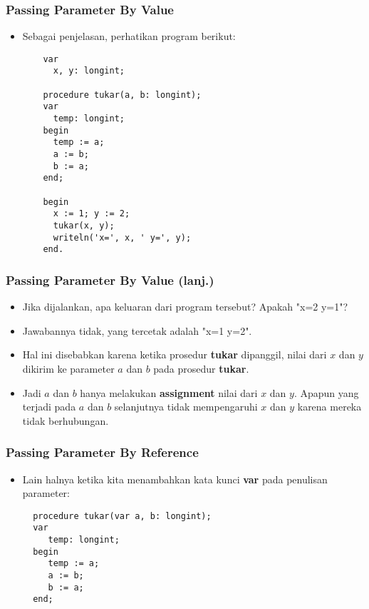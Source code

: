 \documentclass{beamer}
\begin{document}
\begin{frame}[fragile]
\frametitle{Passing Parameter By Value}
\begin{itemize}
  \item Sebagai penjelasan, perhatikan program berikut:
  \begin{lstlisting}
    var
      x, y: longint;

    procedure tukar(a, b: longint);
    var
      temp: longint;
    begin
      temp := a;
      a := b;
      b := a;
    end;

    begin
      x := 1; y := 2;
      tukar(x, y);
      writeln('x=', x, ' y=', y);
    end.
  \end{lstlisting}
\end{itemize}
\end{frame}

\begin{frame}[fragile]
\frametitle{Passing Parameter By Value (lanj.)}
\begin{itemize}
  \item Jika dijalankan, apa keluaran dari program tersebut? Apakah "x=2 y=1"?
  \item Jawabannya \alert{tidak}, yang tercetak adalah "x=1 y=2".
  \item Hal ini disebabkan karena ketika prosedur \textbf{tukar} dipanggil, \alert{nilai} dari $x$ dan $y$ dikirim ke parameter $a$ dan $b$ pada prosedur \textbf{tukar}.
  \item Jadi $a$ dan $b$ hanya melakukan \textbf{assignment} nilai dari $x$ dan $y$. Apapun yang terjadi pada $a$ dan $b$ selanjutnya tidak mempengaruhi $x$ dan $y$ karena mereka \alert{tidak berhubungan}.
\end{itemize}
\end{frame}

\begin{frame}[fragile]
\frametitle{Passing Parameter By Reference}
\begin{itemize}
  \item Lain halnya ketika kita menambahkan kata kunci \textbf{var} pada penulisan parameter:
  \begin{lstlisting}
  procedure tukar(var a, b: longint);
  var
     temp: longint;
  begin
     temp := a;
     a := b;
     b := a;
  end;
  \end{lstlisting}
\end{itemize}
\end{frame}
\end{document}
